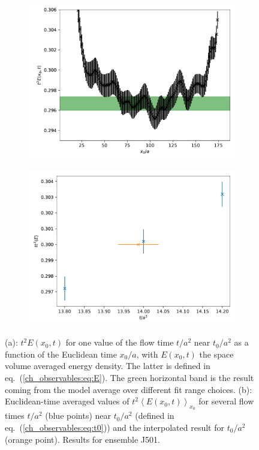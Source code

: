 \begin{figure}
    \begin{subfigure}{.49\textwidth}
    	\includegraphics[width=\textwidth]{./cap3/figs/J501_t2E.pdf}
    	\caption{}
    \end{subfigure}
    \begin{subfigure}{.49\textwidth}
    	\includegraphics[width=\textwidth]{./cap3/figs/t0_J501.pdf}
    	\caption{}
    \end{subfigure}
    \caption{(a): $t^2E(x_0,t)$ for one value of the flow time $t/a^2$ near $t_0/a^2$ as a function of the Euclidean time $x_0/a$, with $E(x_0,t)$ the space volume averaged energy density. The latter is defined in eq.~(\ref{ch_observables:eq:E}). The green horizontal band is the result coming from the model average over different fit range choices. (b): Euclidean-time averaged values of $t^2\left<E(x_0,t)\right>_{x_0}$ for several flow times $t/a^2$ (blue points) near $t_0/a^2$ (defined in eq.~(\ref{ch_observables:eq:t0})) and the interpolated result for $t_0/a^2$ (orange point). Results for ensemble J501.}
        \label{ch_observables:fig:t2E}
\end{figure}

